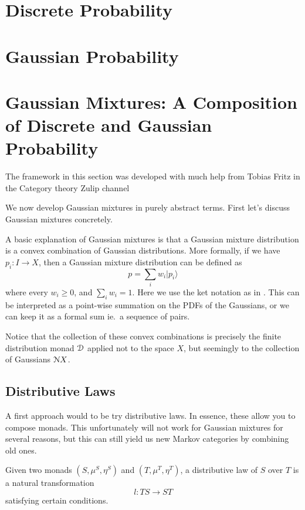 \section{Discrete Probability}
\section{Gaussian Probability}
\section{Gaussian Mixtures: A Composition of Discrete and Gaussian Probability}

The framework in this section was developed with much help from Tobias Fritz in the Category theory Zulip channel \cite{zulip}

We now develop Gaussian mixtures in purely abstract terms.
First let's discuss Gaussian mixtures concretely.

A basic explanation of Gaussian mixtures is that a Gaussian mixture distribution is a convex combination of Gaussian distributions.
More formally, if we have $p_i: I\rightarrow X$, then a Gaussian mixture distribution can be defined as
\begin{equation}
    p = \sum_i w_i | p_i \rangle
\end{equation}
where every $w_i \geq 0$, and $\sum_i w_i = 1$.
Here we use the ket notation as in \cite{cho-jacobs}.
This can be interpreted as a point-wise summation on the PDFs of the Gaussians, or we can keep it as a formal sum ie.\ a sequence of pairs.

Notice that the collection of these convex combinations is precisely the finite distribution monad $\mathcal{D}$ applied not to the space $X$, but seemingly to the collection of Gaussians $\mathcal{N} X$.

\subsection{Distributive Laws}

A first approach would to be try distributive laws.
In essence, these allow you to compose monads.
This unfortunately will not work for Gaussian mixtures for several reasons, but this can still yield us new Markov categories by combining old ones.

Given two monads $(S,\mu^S, \eta^S)$ and $(T, \mu^T,\eta^T)$, a distributive law of $S$ over $T$ is a natural transformation
\begin{equation}
    l:TS\rightarrow ST
\end{equation}
satisfying certain conditions. 

